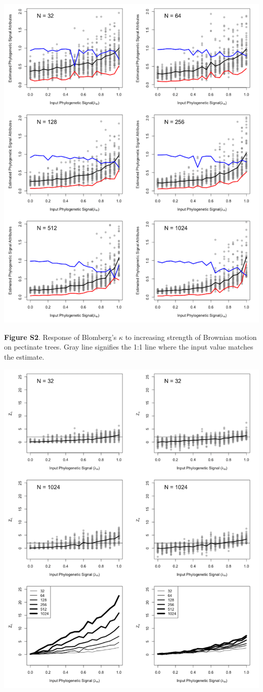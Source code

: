 \documentclass[
]{article}
\begin{document}
\includegraphics[width=0.95\linewidth]{fig.S2}

\textbf{Figure S2}. Response of Blomberg's \(\kappa\) to increasing
strength of Brownian motion on pectinate trees. Gray line signifies the
1:1 line where the input value matches the estimate.

\includegraphics[width=0.95\linewidth]{fig.S3}
\end{document}
